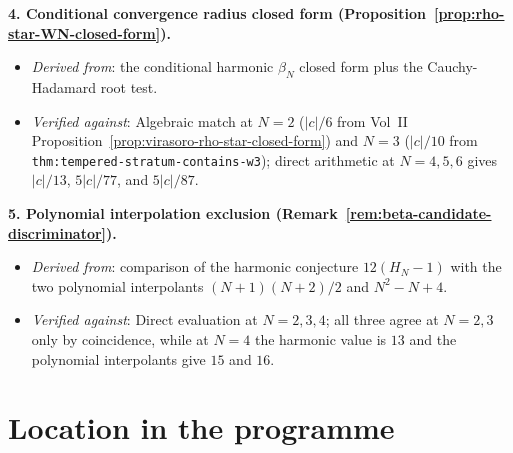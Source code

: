 \textbf{4. Conditional convergence radius closed form
(Proposition~\ref{prop:rho-star-WN-closed-form}).}
\begin{itemize}[nosep]
\item \emph{Derived from}: the conditional harmonic $\beta_N$ closed form plus
 the Cauchy-Hadamard root test.
\item \emph{Verified against}: Algebraic match at $N = 2$ ($|c|/6$
 from Vol~II Proposition~\ref{prop:virasoro-rho-star-closed-form}) and $N = 3$
 ($|c|/10$ from \texttt{thm:tempered-stratum-contains-w3}); direct
 arithmetic at $N = 4, 5, 6$ gives $|c|/13$, $5|c|/77$, and
 $5|c|/87$.
\end{itemize}

\textbf{5. Polynomial interpolation exclusion
(Remark~\ref{rem:beta-candidate-discriminator}).}
\begin{itemize}[nosep]
\item \emph{Derived from}: comparison of the harmonic conjecture
 $12(H_N-1)$ with the two polynomial interpolants $(N+1)(N+2)/2$ and
 $N^2 - N + 4$.
\item \emph{Verified against}: Direct evaluation at $N = 2, 3, 4$;
 all three agree at $N = 2, 3$ only by coincidence, while at $N = 4$
 the harmonic value is $13$ and the polynomial interpolants give
 $15$ and $16$.
\end{itemize}

\section{Location in the programme}
\label{sec:wn-tempered-closure-location}

